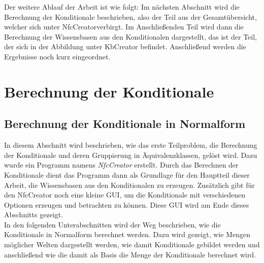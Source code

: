 \documentclass[12pt,a4paper]{article}
\begin{document}
Der weitere Ablauf der Arbeit ist wie folgt: Im nächsten Abschnitt wird die Berechnung der Konditionale beschrieben, also der Teil aus der Gesamtübersicht, welcher sich unter \glqq NfcCreator\grqq \space verbirgt. Im Anschließenden Teil wird dann die Berechnung der Wissensbasen aus den Konditionalen dargestellt, das ist der Teil, der sich in der Abbildung unter \glqq KbCreator \grqq \space befindet. Anschließend werden die Ergebnisse noch kurz eingeordnet.

\section{Berechnung der Konditionale}

\subsection{Berechnung der Konditionale in Normalform}

In diesem Abschnitt wird beschrieben, wie das erste Teilproblem, die Berechnung der Konditionale und deren Gruppierung in Äquivalenzklassen, gelöst wird. Dazu wurde ein Programm namens \textit{NfcCreator} erstellt. Durch das Berechnen der Konditionale dient das Programm dann als Grundlage für den Hauptteil dieser Arbeit, die Wissensbasen aus den Konditionalen zu erzeugen. Zusätzlich gibt für den NfcCreator noch eine kleine GUI, um die Konditionale mit verschiedenen Optionen erzeugen und betrachten zu können. Diese GUI wird am Ende dieses Abschnitts gezeigt. \\
In den folgenden Unterabschnitten wird der Weg beschrieben, wie die Konditionale in Normalform berechnet werden. Dazu wird gezeigt, wie Mengen möglicher Welten dargestellt werden, wie damit Konditionale gebildet werden und anschließend wie die damit als Basis die Menge der Konditionale berechnet wird.
\end{document}

